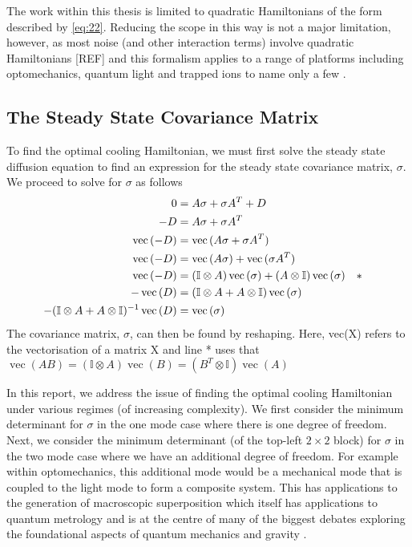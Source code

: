 \documentclass[11pt,a4paper]{article}
\numberwithin{equation}{section}
\DeclareMathOperator{\Vect}{vec}
\begin{document}
	The work within this thesis is limited to quadratic Hamiltonians of the form described by \ref{eq:22}. Reducing the scope in this way is not a major limitation, however, as most noise (and other interaction terms) involve quadratic Hamiltonians [REF] and this formalism applies to a range of platforms including optomechanics, quantum light and trapped ions to name only a few \cite{Serafini17}. 
	
	\subsection{The Steady State Covariance Matrix}
	\label{sec:sigmasolve}
	
	To find the optimal cooling Hamiltonian, we must first solve the steady state diffusion equation to find an expression for the steady state covariance matrix, $\sigma$. We proceed to solve for $\sigma$ as follows
	\begin{align}\label{eq:40}
	0 &= A\sigma +\sigma A^{T} + D&\notag\\
	-D &= A\sigma +\sigma A^{T}&\notag\\
	\Vect{(-D)} &= \Vect{(A\sigma +\sigma A^{T})}&\notag\\
	\Vect{(-D)} &= \Vect{(A\sigma)} + \Vect{(\sigma A^{T})}&\notag\\
	\Vect{(-D)} &= (\mathbb{I} \otimes A)\Vect{(\sigma)} + (A \otimes \mathbb{I})\Vect{(\sigma)}\quad*\notag&\\
	-\Vect{(D)} &= (\mathbb{I} \otimes A + A \otimes \mathbb{I}) \Vect{(\sigma)}\notag&\\
	-(\mathbb{I} \otimes A + A \otimes \mathbb{I})^{-1}\Vect{(D)} &= \Vect{(\sigma)}&
	\end{align}
	The covariance matrix, $\sigma$, can then be found by reshaping.
	Here, vec(X) refers to the vectorisation of a matrix X and line * uses that $\Vect{(AB)}=(\mathbb{I} \otimes A)\Vect{(B)}=(B^{T} \otimes \mathbb{I})\Vect{(A)}$

	
	\color{red}In this report, we address the issue of finding the optimal cooling Hamiltonian under various regimes (of increasing complexity). We first consider the minimum determinant for $\sigma$ in the one mode case where there is one degree of freedom. Next, we consider the minimum determinant (of the top-left $2 \times 2$ block) for $\sigma$ in the two mode case where we have an additional degree of freedom. For example within optomechanics, this additional mode would be a mechanical mode that is coupled to the light mode to form a composite system. This has applications to the generation of macroscopic superposition \cite{Hoff} which itself has applications to quantum metrology \cite{Giovannetti} and is at the centre of many of the biggest debates exploring the foundational aspects of quantum mechanics and gravity \cite{Pikovski}. \color{black}	
	
\end{document}
